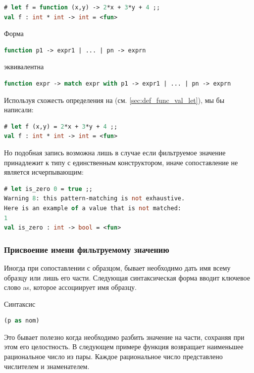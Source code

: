 \begin{lstlisting}[language=OCaml]
# let f = function (x,y) -> 2*x + 3*y + 4 ;;
val f : int * int -> int = <fun>
\end{lstlisting}

Форма

\begin{lstlisting}[language=OCaml]
 function p1 -> expr1 | ... | pn -> exprn 
\end{lstlisting}

эквивалентна

\begin{lstlisting}[language=OCaml]
function expr -> match expr with p1 -> expr1 | ... | pn -> exprn
\end{lstlisting}

Используя схожесть определения на (см. \ref{sec:def_func_val_let}), мы бы
написали:

\begin{lstlisting}[language=OCaml]
# let f (x,y) = 2*x + 3*y + 4 ;;
val f : int * int -> int = <fun>
\end{lstlisting}

Но подобная запись возможна лишь в случае если фильтруемое значение принадлежит
к типу с единственным конструктором, иначе сопоставление не является
исчерпывающим:

\begin{lstlisting}[language=OCaml]
# let is_zero 0 = true ;;
Warning 8: this pattern-matching is not exhaustive.
Here is an example of a value that is not matched:
1
val is_zero : int -> bool = <fun>
\end{lstlisting}

\subsubsection{Присвоение имени фильтруемому значению}

Иногда при сопоставлении с образцом, бывает необходимо дать имя всему образцу
или лишь его части. Следующая синтаксическая форма вводит ключевое слово as,
которое ассоциирует имя образцу.

Синтаксис

\begin{lstlisting}[language=OCaml]
(p as nom)
\end{lstlisting}

Это бывает полезно когда необходимо разбить значение на части, сохраняя при этом
его целостность. В следующем примере функция возвращает наименьшее рациональное
число из пары. Каждое рациональное число представлено числителем и знаменателем.

